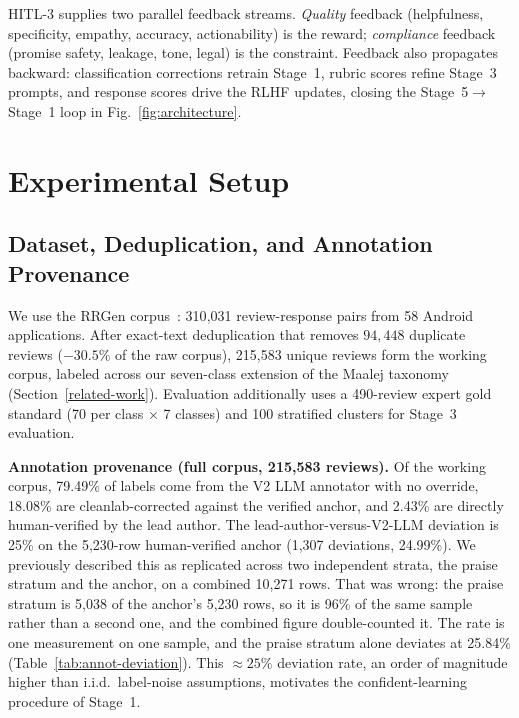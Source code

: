 \documentclass[sigconf, anonymous]{acmart}
\begin{document}
  HITL-3 supplies two parallel feedback streams. \emph{Quality}
  feedback (helpfulness, specificity, empathy, accuracy, actionability)
  is the reward; \emph{compliance} feedback (promise safety, leakage,
  tone, legal) is the constraint. Feedback also propagates backward:
  classification corrections retrain Stage~1, rubric scores refine
  Stage~3 prompts, and response scores drive the RLHF updates, closing
  the Stage~5$\to$Stage~1 loop in Fig.~\ref{fig:architecture}.
\section{Experimental Setup}\label{experiments}

\subsection{Dataset, Deduplication, and Annotation Provenance}
We use the RRGen corpus~\cite{gao2019automating}: 310{,}031 review-response pairs from 58 Android applications. After exact-text deduplication that removes $94{,}448$ duplicate reviews ($-30.5\%$ of the raw corpus), 215{,}583 unique reviews form the working corpus, labeled across our seven-class extension of the Maalej taxonomy~\cite{maalej2015bug} (Section~\ref{related-work}). Evaluation additionally uses a 490-review expert gold standard (70 per class $\times$ 7 classes) and 100 stratified clusters for Stage~3 evaluation.

\textbf{Annotation provenance (full corpus, 215{,}583 reviews).} Of the working corpus, 79.49\% of labels come from the V2 LLM annotator with no override, 18.08\% are cleanlab-corrected against the verified anchor, and 2.43\% are directly human-verified by the lead author. The lead-author-versus-V2-LLM deviation is 25\% on the 5{,}230-row human-verified anchor
(1{,}307 deviations, 24.99\%). We previously described this as replicated across two independent
strata, the praise stratum and the anchor, on a combined 10{,}271 rows. That was wrong: the praise
stratum is 5{,}038 of the anchor's 5{,}230 rows, so it is 96\% of the same sample rather than a
second one, and the combined figure double-counted it. The rate is one measurement on one sample,
and the praise stratum alone deviates at 25.84\% (Table~\ref{tab:annot-deviation}). This $\approx 25\%$ deviation rate, an order of magnitude higher than i.i.d.\ label-noise assumptions, motivates the confident-learning procedure of Stage~1.
\end{document}
